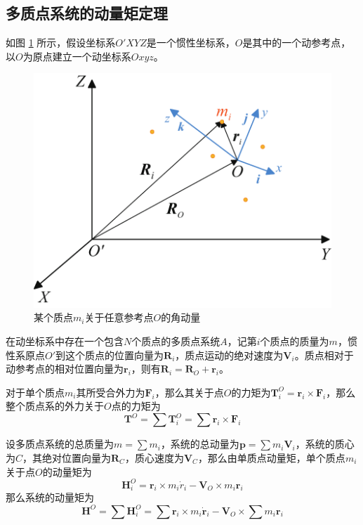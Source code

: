 
\clearpage

\subsection{多质点系统的动量矩定理}
如图 \ref{多质点角动量} 所示，假设坐标系$O'XYZ$是一个惯性坐标系，$O$是其中的一个动参考点，以$O$为原点建立一个动坐标系$Oxyz$。
\begin{figure}[!htb]
	\centering
	\includegraphics[width=0.4\linewidth]{pic/多质点角动量}
	\vspace*{-1em}
	\caption{某个质点$m_i$关于任意参考点$O$的角动量}
	\label{多质点角动量}
\end{figure}

在动坐标系中存在一个包含$N$个质点的多质点系统$A$，记第$i$个质点的质量为$m$，惯性系原点$O'$到这个质点的位置向量为$\bm{R}_i$，质点运动的绝对速度为$\bm{V}_i$。质点相对于动参考点的相对位置向量为$\bm{r}_i$，则有$\bm{R}_i = \bm{R}_O + \bm{r}_i$。

对于单个质点$m_i$其所受合外力为$\bm{F}_i$，那么其关于点$O$的力矩为$\bm{T}_i^O = \bm{r}_i \times \bm{F}_i$，那么整个质点系的外力关于$O$点的力矩为
\begin{equation}
	\bm{T}^O = \sum \bm{T}_i^O = \sum \bm{r}_i \times \bm{F}_i
\end{equation}

设多质点系统的总质量为$m = \displaystyle \sum m_i$，系统的总动量为$\bm{p} =  \displaystyle \sum m_i \bm{V}_i$，系统的质心为$C$，其绝对位置向量为$\bm{R}_C$，质心速度为$\bm{V}_C$，那么由单质点动量矩，单个质点$m_i$关于点$O$的动量矩为
\begin{equation*}
	\bm{H}_i^O = \bm{r}_i \times m_i \dot{r}_i - \bm{V}_O \times m_i \bm{r}_i
\end{equation*}
那么系统的动量矩为
\begin{equation}
	\bm{H}^O = \sum \bm{H}_i^O = \sum \bm{r}_i \times m_i \dot{\bm{r}}_i - \bm{V}_O \times \sum m_i \bm{r}_i
\end{equation}

